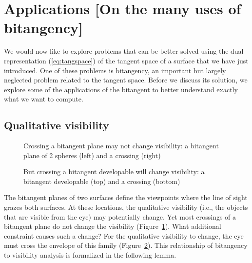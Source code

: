 \documentclass[12pt]{article}
\begin{document}
\section{Applications [On the many uses of bitangency]}
\label{sec:uses}

We would now like to explore problems that can be better solved using the
dual representation (\ref{eq:tangspace}) of the tangent space of a surface
that we have just introduced.
One of these problems is bitangency, an important but largely neglected 
problem related to the tangent space.
Before we discuss its solution, we explore some of the applications
of the bitangent to better understand exactly what we want to compute.


\subsection{Qualitative visibility}

\begin{figure}[b]
\caption{Crossing a bitangent plane may not change visibility: a bitangent plane of 2 spheres (left) and a crossing (right)}
\label{fig:vis1}
\end{figure}

\begin{figure}[b]
\caption{But crossing a bitangent developable will change visibility: a bitangent developable (top) and a crossing (bottom)}
\label{fig:vis2}
\end{figure}

The bitangent planes of two surfaces define the viewpoints where the line
of sight grazes both surfaces.
At these locations, the qualitative visibility (i.e., the objects
that are visible from the eye) may potentially change.
Yet most crossings of a bitangent plane do not change the visibility
(Figure~\ref{fig:vis1}).
What additional constraint causes such a change?
For the qualitative visibility to change, the eye must cross the
envelope of this family (Figure~\ref{fig:vis2}).
This relationship of bitangency to visibility analysis is formalized
in the following lemma.
\end{document}
